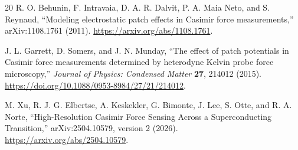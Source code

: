 \documentclass[11pt]{article}
\begin{document}
\begin{thebibliography}{20}
R. O. Behunin, F. Intravaia, D. A. R. Dalvit, P. A. Maia Neto, and
S. Reynaud,
``Modeling electrostatic patch effects in Casimir force measurements,''
arXiv:1108.1761 (2011).
\url{https://arxiv.org/abs/1108.1761}.

J. L. Garrett, D. Somers, and J. N. Munday,
``The effect of patch potentials in Casimir force measurements determined by
heterodyne Kelvin probe force microscopy,''
\emph{Journal of Physics: Condensed Matter} \textbf{27}, 214012 (2015).
\url{https://doi.org/10.1088/0953-8984/27/21/214012}.

M. Xu, R. J. G. Elbertse, A. Keskekler, G. Bimonte, J. Lee, S. Otte, and
R. A. Norte,
``High-Resolution Casimir Force Sensing Across a Superconducting Transition,''
arXiv:2504.10579, version 2 (2026).
\url{https://arxiv.org/abs/2504.10579}.

\end{thebibliography}
\endgroup
\end{document}
